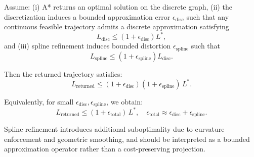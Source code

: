 
\begin{proposition}
Assume:
(i) A* returns an optimal solution on the discrete graph,
(ii) the discretization induces a bounded approximation error $\epsilon_{\mathrm{disc}}$ such that any continuous feasible trajectory admits a discrete approximation satisfying
\begin{equation}
L_{\mathrm{disc}} \le (1 + \epsilon_{\mathrm{disc}}) L^*,
\end{equation}
and (iii) spline refinement induces bounded distortion $\epsilon_{\mathrm{spline}}$ such that
\begin{equation}
L_{\mathrm{spline}} \le (1 + \epsilon_{\mathrm{spline}}) L_{\mathrm{disc}}.
\end{equation}

Then the returned trajectory satisfies:
\begin{equation}
L_{\mathrm{returned}} \le (1 + \epsilon_{\mathrm{disc}})(1 + \epsilon_{\mathrm{spline}})\, L^*.
\end{equation}

Equivalently, for small $\epsilon_{\mathrm{disc}}, \epsilon_{\mathrm{spline}}$, we obtain:
\begin{equation}
L_{\mathrm{returned}} \le (1 + \epsilon_{\mathrm{total}})\, L^*,
\quad
\epsilon_{\mathrm{total}} \approx \epsilon_{\mathrm{disc}} + \epsilon_{\mathrm{spline}}.
\end{equation}
\end{proposition}

\begin{remark}
Spline refinement introduces additional suboptimality due to curvature enforcement and geometric smoothing, and should be interpreted as a bounded approximation operator rather than a cost-preserving projection.
\end{remark}